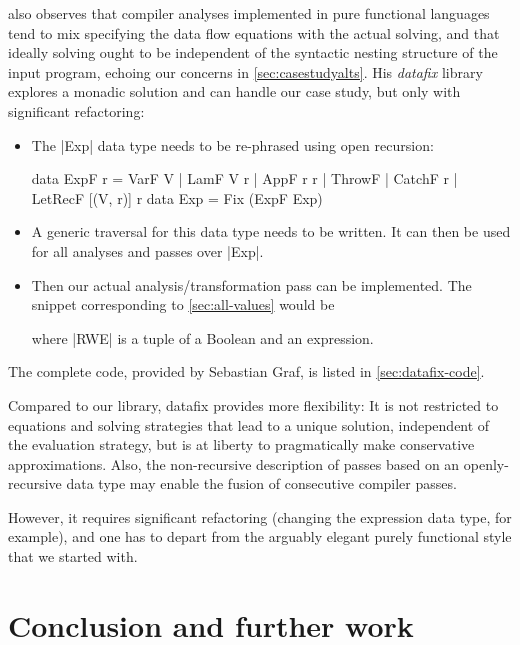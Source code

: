 \documentclass[manuscript,screen,acmsmall,nonacm]{acmart}
\begin{document}
 also observes that compiler analyses implemented in pure functional languages tend to mix specifying the data flow equations with the actual solving, and that ideally solving ought to be independent of the syntactic nesting structure of the input program, echoing our concerns in \cref{sec:casestudyalts}. His \emph{datafix} library explores a monadic solution and can handle our case study, but only with significant refactoring:
\begin{itemize}
\item The |Exp| data type needs to be re-phrased using open recursion:
\begin{code}
data ExpF r =  VarF V | LamF V r | AppF r r | ThrowF | CatchF r | LetRecF [(V, r)] r
data Exp = Fix (ExpF Exp)
\end{code}
\item A generic traversal for this data type needs to be written. It can then be used for all analyses and passes over |Exp|.
\item Then our actual analysis/transformation pass can be implemented. The snippet corresponding to \cref{sec:all-values} would be
where |RWE| is a tuple of a Boolean and an expression.
\end{itemize}
The complete code, provided by Sebastian Graf, is listed in \cref{sec:datafix-code}.

Compared to our library, datafix provides more flexibility: It is not restricted to equations and solving strategies that lead to a unique solution, independent of the evaluation strategy, but is at liberty to pragmatically make conservative approximations. Also, the non-recursive description of passes based on an openly-recursive data type may enable the fusion of consecutive compiler passes.

However, it requires significant refactoring (changing the expression data type, for example), and one has to depart from the arguably elegant purely functional style that we started with.

\section{Conclusion and further work}
\end{document}
